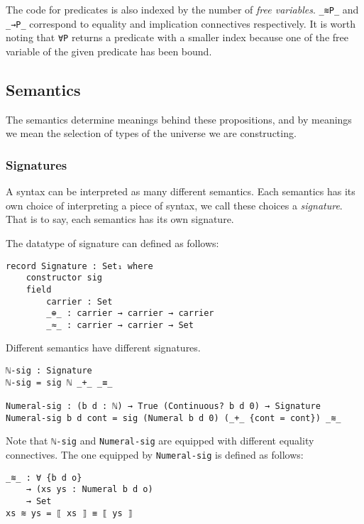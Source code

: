 \documentclass[\main/thesis.tex]{subfiles}
\begin{document}
The code for predicates is also indexed by the number of \textit{free variables}.
\lstinline|_≋P_| and \lstinline|_→P_| correspond to equality and  implication
connectives respectively.
It is worth noting that \lstinline|∀P| returns a predicate with a smaller index
because one of the free variable of the given predicate has been bound.

\subsection{Semantics}

The semantics determine meanings behind these propositions, and by meanings
we mean the selection of types of the universe we are constructing.

\subsubsection{Signatures}

A syntax can be interpreted as many different semantics.
Each semantics has its own choice of interpreting a piece of syntax,
we call these choices a \textit{signature}.
That is to say, each semantics has its own signature.

The datatype of signature can defined as follows:

\begin{lstlisting}
record Signature : Set₁ where
    constructor sig
    field
        carrier : Set
        _⊕_ : carrier → carrier → carrier
        _≈_ : carrier → carrier → Set
\end{lstlisting}

Different semantics have different signatures.

\begin{lstlisting}
ℕ-sig : Signature
ℕ-sig = sig ℕ _+_ _≡_

Numeral-sig : (b d : ℕ) → True (Continuous? b d 0) → Signature
Numeral-sig b d cont = sig (Numeral b d 0) (_+_ {cont = cont}) _≋_
\end{lstlisting}


Note that \lstinline|ℕ-sig| and \lstinline|Numeral-sig| are equipped with
different equality connectives.
The one equipped by \lstinline|Numeral-sig| is defined as follows:

\begin{lstlisting}
_≋_ : ∀ {b d o}
    → (xs ys : Numeral b d o)
    → Set
xs ≋ ys = ⟦ xs ⟧ ≡ ⟦ ys ⟧
\end{lstlisting}
\end{document}
